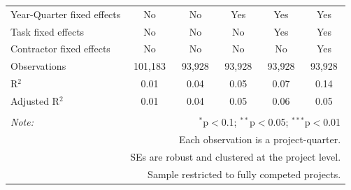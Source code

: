 \documentclass[
]{article}
\begin{document}
\begin{table}[H]
\begin{tabular}{@{\extracolsep{-2pt}}lccccc}
Year-Quarter fixed effects & No & No & Yes & Yes & Yes \\ 
Task fixed effects & No & No & No & Yes & Yes \\ 
Contractor fixed effects & No & No & No & No & Yes \\ 
Observations & 101,183 & 93,928 & 93,928 & 93,928 & 93,928 \\ 
R$^{2}$ & 0.01 & 0.04 & 0.05 & 0.07 & 0.14 \\ 
Adjusted R$^{2}$ & 0.01 & 0.04 & 0.05 & 0.06 & 0.05 \\ 
\hline 
\hline \\[-1.8ex] 
\textit{Note:}  & \multicolumn{5}{r}{$^{*}$p$<$0.1; $^{**}$p$<$0.05; $^{***}$p$<$0.01} \\ 
 & \multicolumn{5}{r}{Each observation is a project-quarter.} \\ 
 & \multicolumn{5}{r}{SEs are robust and clustered at the project level.} \\ 
 & \multicolumn{5}{r}{Sample restricted to fully competed projects.} \\ 
\end{tabular} 
\end{table}
\end{document}
